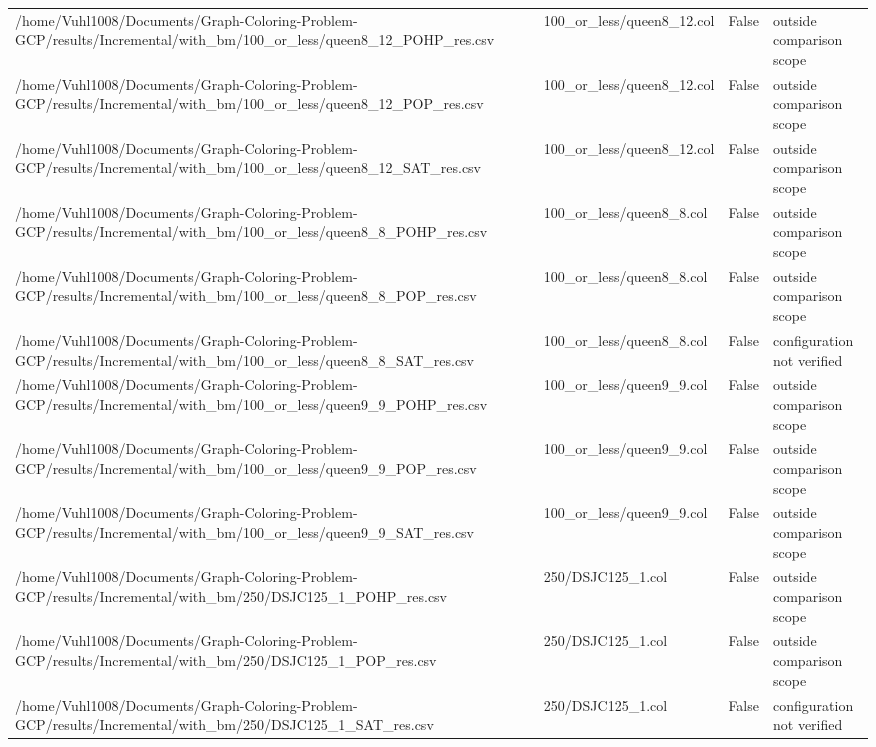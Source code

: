 \begin{table}[htbp]
\begin{tabular}{llll}
/home/Vuhl1008/Documents/Graph-Coloring-Problem-GCP/results/Incremental/with\_bm/100\_or\_less/queen8\_12\_POHP\_res.csv & 100\_or\_less/queen8\_12.col & False & outside comparison scope \\
/home/Vuhl1008/Documents/Graph-Coloring-Problem-GCP/results/Incremental/with\_bm/100\_or\_less/queen8\_12\_POP\_res.csv & 100\_or\_less/queen8\_12.col & False & outside comparison scope \\
/home/Vuhl1008/Documents/Graph-Coloring-Problem-GCP/results/Incremental/with\_bm/100\_or\_less/queen8\_12\_SAT\_res.csv & 100\_or\_less/queen8\_12.col & False & outside comparison scope \\
/home/Vuhl1008/Documents/Graph-Coloring-Problem-GCP/results/Incremental/with\_bm/100\_or\_less/queen8\_8\_POHP\_res.csv & 100\_or\_less/queen8\_8.col & False & outside comparison scope \\
/home/Vuhl1008/Documents/Graph-Coloring-Problem-GCP/results/Incremental/with\_bm/100\_or\_less/queen8\_8\_POP\_res.csv & 100\_or\_less/queen8\_8.col & False & outside comparison scope \\
/home/Vuhl1008/Documents/Graph-Coloring-Problem-GCP/results/Incremental/with\_bm/100\_or\_less/queen8\_8\_SAT\_res.csv & 100\_or\_less/queen8\_8.col & False & configuration not verified \\
/home/Vuhl1008/Documents/Graph-Coloring-Problem-GCP/results/Incremental/with\_bm/100\_or\_less/queen9\_9\_POHP\_res.csv & 100\_or\_less/queen9\_9.col & False & outside comparison scope \\
/home/Vuhl1008/Documents/Graph-Coloring-Problem-GCP/results/Incremental/with\_bm/100\_or\_less/queen9\_9\_POP\_res.csv & 100\_or\_less/queen9\_9.col & False & outside comparison scope \\
/home/Vuhl1008/Documents/Graph-Coloring-Problem-GCP/results/Incremental/with\_bm/100\_or\_less/queen9\_9\_SAT\_res.csv & 100\_or\_less/queen9\_9.col & False & outside comparison scope \\
/home/Vuhl1008/Documents/Graph-Coloring-Problem-GCP/results/Incremental/with\_bm/250/DSJC125\_1\_POHP\_res.csv & 250/DSJC125\_1.col & False & outside comparison scope \\
/home/Vuhl1008/Documents/Graph-Coloring-Problem-GCP/results/Incremental/with\_bm/250/DSJC125\_1\_POP\_res.csv & 250/DSJC125\_1.col & False & outside comparison scope \\
/home/Vuhl1008/Documents/Graph-Coloring-Problem-GCP/results/Incremental/with\_bm/250/DSJC125\_1\_SAT\_res.csv & 250/DSJC125\_1.col & False & configuration not verified \\

\end{tabular}
\end{table}

